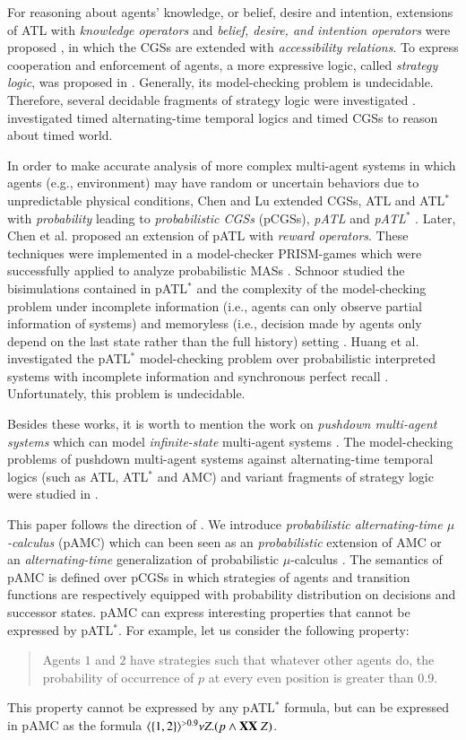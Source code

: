 \documentclass[letterpaper]{article}
\newcommand{\pamc}{{pAMC}\xspace}
\newcommand{\opX}{{\bf X}}
\newcommand{\opA}[1]{\langle{#1}\rangle}
\begin{document}
For reasoning about agents' knowledge, or belief, desire and intention, extensions of ATL with \emph{knowledge operators} \cite{HkW02} and
\emph{belief, desire, and intention operators} were proposed \cite{BB05}, in which the CGSs are extended with \emph{accessibility relations}.
To express cooperation and enforcement of agents, a more expressive logic, called \emph{strategy logic}, was proposed in \cite{MMV10}.
Generally, its model-checking problem is undecidable. Therefore, several decidable fragments of strategy logic were investigated \cite{CLM15,MMS13,MMS14,MMPV14}.
\cite{HP06,BLMO07} investigated timed alternating-time temporal logics and timed CGSs to reason about timed world.


In order to make accurate analysis of more complex multi-agent systems in which agents (e.g., environment) may have random or uncertain behaviors due to unpredictable physical
conditions,  Chen and Lu extended CGSs, ATL and ATL$^*$ with \emph{probability} leading to \emph{probabilistic CGSs} (pCGSs), \emph{pATL} and \emph{pATL$^*$} \cite{CL07a}.
Later, Chen et al. proposed an extension of pATL with \emph{reward operators}. These techniques were implemented in a model-checker {PRISM}-games which were successfully applied to analyze probabilistic MASs \cite{CFKPS12,CFKPS13b}. Schnoor studied the bisimulations contained in pATL$^*$ and the complexity of the model-checking problem under incomplete information (i.e., agents can only observe partial information of  systems) and memoryless (i.e., decision made by agents only depend on the last state rather than the full history) setting \cite{Sch10}.
Huang et al. investigated the pATL$^*$ model-checking problem over probabilistic interpreted systems with incomplete
information and synchronous perfect recall \cite{HSZ12}. Unfortunately, this problem is undecidable.


Besides these works, it is worth to mention the work on \emph{pushdown multi-agent systems} which can model \emph{infinite-state} multi-agent systems \cite{MP15}.
The model-checking problems of pushdown multi-agent systems against alternating-time temporal logics (such as ATL, ATL$^*$ and AMC) and variant fragments of strategy logic were studied in
\cite{MP15,CSW16a,CSW16b}.


This paper follows the direction of \cite{CL07a}. We introduce \emph{probabilistic alternating-time $\mu$-calculus} (\pamc) which can been seen as an \emph{probabilistic} extension of AMC or an \emph{alternating-time} generalization of probabilistic $\mu$-calculus \cite{CKP15}.
The semantics of \pamc is defined over pCGSs in which strategies of agents and transition functions are respectively equipped with probability distribution on decisions and successor states. \pamc can express interesting properties that cannot be expressed by pATL$^*$. For example, let us consider the following property:
\begin{quote}
Agents $1$ and $2$ have strategies such that whatever other agents do, the probability of occurrence of $p$ at every even position is greater than 0.9.
\end{quote}
This property cannot be expressed by any pATL$^*$ formula, but can be expressed in \pamc as the formula $\opA{\{1,2\}}^{> 0.9}\nu Z.(p\wedge \opX \opX \ Z)$.
\end{document}
